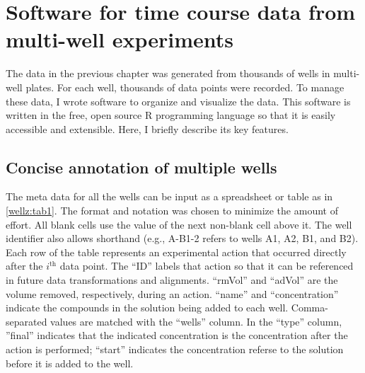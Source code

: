 \chapter[Multi-well time course software]{Software for time course data from multi-well experiments}

The data in the previous chapter was generated from thousands of wells
in multi-well plates. For each well, thousands of data points were recorded.
To manage these data, I wrote software to organize and visualize the data.
This software is written in the free, open source R programming language
so that it is easily accessible and extensible. Here, I briefly describe
its key features.


\section{Concise annotation of multiple wells}

The meta data for all the wells can be input as a spreadsheet or
table as in \autoref{wellz:tab1}. The format and notation was chosen
to minimize the amount of effort. All blank cells use the value
of the next non-blank cell above it. The well identifier also
allows shorthand (e.g., A-B1-2 refers to wells A1, A2, B1, and B2).
Each row of the table represents an experimental action that occurred
directly after the $i^{\text{th}}$ data point. The ``ID'' labels
that action so that it can be referenced in future data transformations and alignments.
``rmVol'' and ``adVol''
are the volume removed, respectively, during an action.
``name'' and ``concentration'' indicate the compounds in the solution
being added to each well. Comma-separated values are matched with the
``wells'' column. In the ``type'' column, ''final'' indicates that
the indicated concentration is the concentration after the action is
performed; ``start'' indicates the concentration referse to the solution
before it is added to the well.


